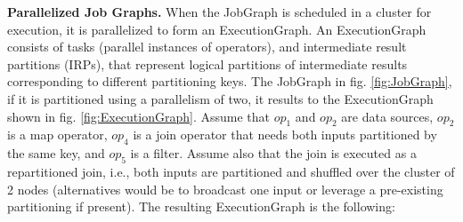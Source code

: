 \documentclass{sig-alternate}
\begin{document}
\textbf{Parallelized Job Graphs.} When the JobGraph is scheduled in a cluster for execution, it is parallelized to form an ExecutionGraph. An ExecutionGraph consists of tasks (parallel instances of operators), and intermediate result partitions (IRPs), that represent logical partitions of intermediate results corresponding to different partitioning keys. The JobGraph in fig. \ref{fig:JobGraph}, if it is partitioned using a parallelism of two, it results to the ExecutionGraph shown in fig. \ref{fig:ExecutionGraph}. Assume that $op_1$ and $op_2$ are data sources, $op_2$ is a map operator, $op_4$ is a join operator that needs both inputs partitioned by the same key, and $op_5$ is a filter. Assume also that the join is executed as a repartitioned join, i.e., both inputs are partitioned and shuffled over the cluster of 2 nodes (alternatives would be to broadcast one input or leverage a pre-existing partitioning if present). The resulting ExecutionGraph is the following:
\end{document}

